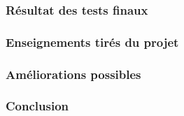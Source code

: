\documentclass[xcolor=table]{beamer}
\begin{document}
\begin{frame}
\frametitle{Résultat des tests finaux}

\end{frame}

\begin{frame}
\frametitle{Enseignements tirés du projet}

\end{frame}


\begin{frame}
\frametitle{Améliorations possibles}
\end{frame}

\begin{frame}
\frametitle{Conclusion}
\end{frame}




\end{document}
